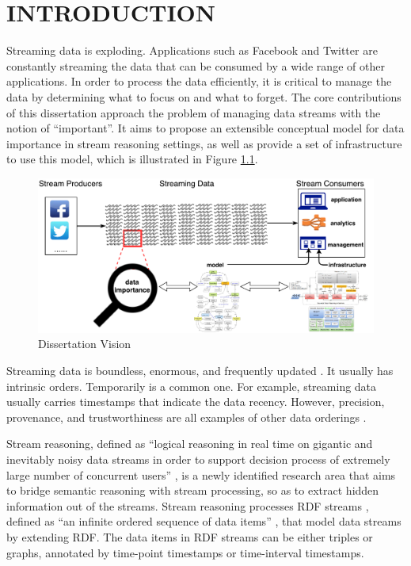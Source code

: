 \chapter{INTRODUCTION}
Streaming data is exploding. 
Applications such as Facebook and Twitter are constantly streaming the data that can be consumed by a wide range of other applications.
In order to process the data efficiently, it is critical to manage the data by determining what to focus on and what to forget. 
The core contributions of this dissertation approach the problem of managing data streams with the notion of ``important''.
It aims to propose an extensible conceptual model for data importance in stream reasoning settings, as well as provide a set of infrastructure to use this model, which is illustrated in Figure \ref{fig:1-tv}.

\begin{figure}[!htbp]
	\centering
    \includegraphics[width=5in]{img/1-tv.pdf}
    \caption{Dissertation Vision}
    \label{fig:1-tv}
\end{figure}

Streaming data is boundless, enormous, and frequently updated \cite{rodriguez2009semantic}.
It usually has intrinsic orders. 
Temporarily is a common one.
For example, streaming data usually carries timestamps that indicate the data recency.
However, precision, provenance, and trustworthiness are all examples of other data orderings \cite{della2013order}. 

Stream reasoning, defined as ``logical reasoning in real time on gigantic and inevitably noisy data streams in order to support decision process of extremely large number of concurrent users'' \cite{barbieri2010stream}, is a newly identified research area that aims to bridge semantic reasoning with stream processing, so as to extract hidden information out of the streams.
Stream reasoning processes RDF streams \cite{barbieri2010querying}, defined as ``an infinite ordered sequence of data items'' \cite{srtutorial}, that model data streams by extending RDF.
The data items in RDF streams can be either triples or graphs, annotated by time-point timestamps or time-interval timestamps.

